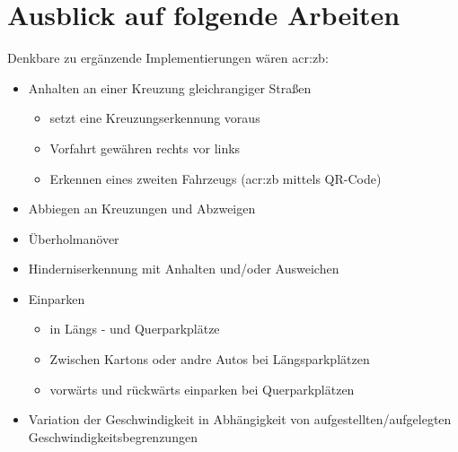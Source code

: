 \chapter{Ausblick auf folgende Arbeiten}

Denkbare zu ergänzende Implementierungen wären \gls{acr:zb}:

\begin{itemize}
\item Anhalten an einer Kreuzung gleichrangiger Straßen
	\begin{itemize}
	\item setzt eine Kreuzungserkennung voraus
	\item Vorfahrt gewähren \glqq rechts vor links\grqq
	\item Erkennen eines zweiten Fahrzeugs (\gls{acr:zb} mittels QR-Code)
	\end{itemize}
\item Abbiegen an Kreuzungen und Abzweigen
\item Überholmanöver
\item Hinderniserkennung mit Anhalten und/oder Ausweichen 
\item Einparken
	\begin{itemize}
	\item in Längs - und Querparkplätze
	\item Zwischen Kartons oder andre Autos bei Längsparkplätzen
	\item vorwärts und rückwärts einparken bei Querparkplätzen
	\end{itemize}
\item Variation der Geschwindigkeit in Abhängigkeit von aufgestellten/aufgelegten Geschwindigkeitsbegrenzungen
\end{itemize}
